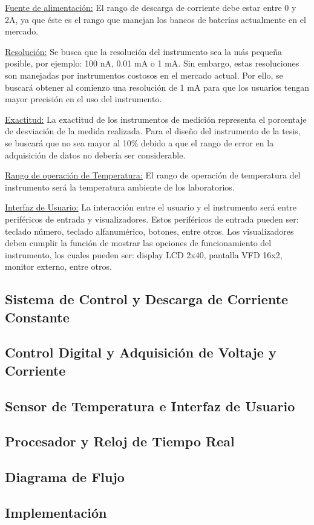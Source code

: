 \underline{Fuente de alimentación:} El rango de descarga de corriente debe estar entre 0 y 2A, ya que éste es el rango que manejan los bancos de baterías actualmente en el mercado.

\underline{Resolución:} Se busca que la resolución del instrumento sea la más pequeña posible, por ejemplo: 100 nA, 0.01 mA o 1 mA. Sin embargo, estas resoluciones son manejadas por instrumentos costosos en el mercado actual. Por ello, se buscará obtener al comienzo una resolución de 1 mA para que los usuarios tengan mayor precisión en el uso del instrumento.

\underline{Exactitud:} La exactitud de los instrumentos de medición representa el porcentaje de desviación de la medida realizada. Para el diseño del instrumento de la tesis, se buscará que no sea mayor al 10\% debido a que el rango de error en la adquisición de datos no debería ser considerable. 

\underline{Rango de operación de Temperatura:} El rango de operación de temperatura del instrumento será la temperatura ambiente de los laboratorios.

\underline{Interfaz de Usuario:} La interacción entre el usuario y el instrumento será entre periféricos de entrada y visualizadores. Estos periféricos de entrada pueden ser: teclado número, teclado alfanumérico, botones, entre otros. Los visualizadores deben cumplir la función de mostrar las opciones de funcionamiento del instrumento, los cuales pueden ser: display LCD 2x40, pantalla VFD 16x2, monitor externo, entre otros.

\subsection{Sistema de Control y Descarga de Corriente Constante}
\subsection{Control Digital y Adquisición de Voltaje y Corriente}
\subsection{Sensor de Temperatura e Interfaz de Usuario}
\subsection{Procesador y Reloj de Tiempo Real}
\subsection{Diagrama de Flujo}
\subsection{Implementación}
